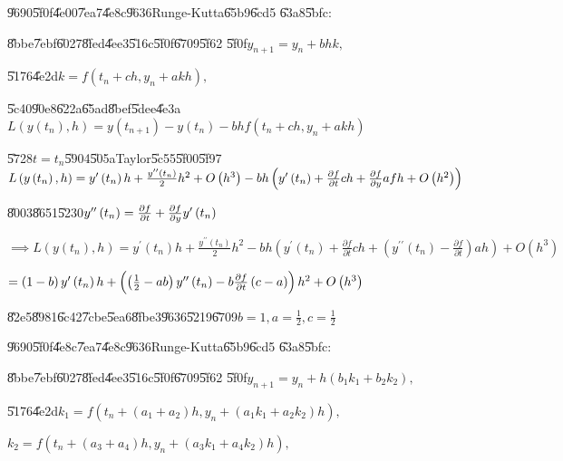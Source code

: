 \documentclass{article}
\begin{document}
\U{9690}\U{5f0f}\U{4e00}\U{7ea7}\U{4e8c}\U{9636}Runge-Kutta\U{65b9}\U{6cd5}%
\U{63a8}\U{5bfc}:

\U{8bbe}\U{7ebf}\U{6027}\U{8fed}\U{4ee3}\U{516c}\U{5f0f}\U{6709}\U{5f62}%
\U{5f0f}$y_{n+1}=y_{n}+bhk,$

\U{5176}\U{4e2d}$k=f\left( t_{n}+ch,y_{n}+akh\right) ,$

\U{5c40}\U{90e8}\U{622a}\U{65ad}\U{8bef}\U{5dee}\U{4e3a}$L\left( y\left(
t_{n}\right) ,h\right) =y\left( t_{n+1}\right) -y\left( t_{n}\right)
-bhf\left( t_{n}+ch,y_{n}+akh\right) $

\U{5728}$t=t_{n}$\U{5904}\U{505a}Taylor\U{5c55}\U{5f00}\U{5f97}$L\left(
y\left( t_{n}\right) ,h\right) =y^{\prime }\left( t_{n}\right) h+\frac{%
y^{\prime \prime }\left( t_{n}\right) }{2}h^{2}+O\left( h^{3}\right)
-bh\left( y^{\prime }\left( t_{n}\right) +\frac{\partial f}{\partial t}ch+%
\frac{\partial f}{\partial y}afh+O\left( h^{2}\right) \right) $

\U{8003}\U{8651}\U{5230}$y^{\prime \prime }\left( t_{n}\right) =\frac{%
\partial f}{\partial t}+\frac{\partial f}{\partial y}y^{\prime }\left(
t_{n}\right) $

$\implies L\left( y\left( t_{n}\right) ,h\right) =y^{\prime }\left(
t_{n}\right) h+\frac{y^{\prime \prime }\left( t_{n}\right) }{2}%
h^{2}-bh\left( y^{\prime }\left( t_{n}\right) +\frac{\partial f}{\partial t}%
ch+\left( y^{\prime \prime }\left( t_{n}\right) -\frac{\partial f}{\partial t%
}\right) ah\right) +O\left( h^{3}\right) $

$=\left( 1-b\right) y^{\prime }\left( t_{n}\right) h+\left( \left( \frac{1}{2%
}-ab\right) y^{\prime \prime }\left( t_{n}\right) -b\frac{\partial f}{%
\partial t}\left( c-a\right) \right) h^{2}+O\left( h^{3}\right) $

\U{82e5}\U{8981}\U{6c42}\U{7cbe}\U{5ea6}\U{8fbe}3\U{9636}\U{5219}\U{6709}$%
b=1,a=\frac{1}{2},c=\frac{1}{2}$

\bigskip 

\U{9690}\U{5f0f}\U{4e8c}\U{7ea7}\U{4e8c}\U{9636}Runge-Kutta\U{65b9}\U{6cd5}%
\U{63a8}\U{5bfc}:

\U{8bbe}\U{7ebf}\U{6027}\U{8fed}\U{4ee3}\U{516c}\U{5f0f}\U{6709}\U{5f62}%
\U{5f0f}$y_{n+1}=y_{n}+h\left( b_{1}k_{1}+b_{2}k_{2}\right) ,$

\U{5176}\U{4e2d}$k_{1}=f\left( t_{n}+\left( a_{1}+a_{2}\right)
h,y_{n}+\left( a_{1}k_{1}+a_{2}k_{2}\right) h\right) ,$

$k_{2}=f\left( t_{n}+\left( a_{3}+a_{4}\right) h,y_{n}+\left(
a_{3}k_{1}+a_{4}k_{2}\right) h\right) ,$
\end{document}
